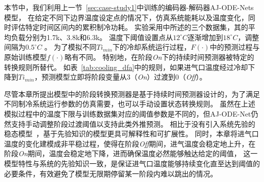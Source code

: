 本节中，我们利用上一节~\ref{sec:case-study1}中训练的编码器-解码器AJ-ODE-Nets模型，
在给定不同下边界温度设定点的情况下，仿真系统能耗以及温度变化，同时评估特定时间区间内的累积制冷功耗。
实验采用中所述的三个数据集，其的平均负载分别为1.7k、3.8k和6.3k。
温度下阈值设置点从$12^{\circ}C$逐渐增加到$18^{\circ}C$，调整间隔为$0.5^{\circ}C$ 。
为了模拟不同$Ti_{min}$下的冷却系统运行过程，$F(\cdot)$中的预测过程与原始训练模型$f(\cdot)$略有不同。
特别地，在阶段\textit{On}下的持续时间预测器被特定的转换规则所替代。
如表~\ref{tab:cooling_dfa}中的规则，如果进气口温度经过冷却下降到$Ti_{min}$，预测模型立即将阶段变量从3（\textit{On}）过渡到0（\textit{Off}）。

    尽管本章所提出模型中的阶段转换预测器是基于持续时间预测器设计的，为了满足不同制冷系统运行参数的仿真需要，也可以手动设置状态转换规则。
    虽然在上述模拟过程中的温度下限与训练数据集对应的阈值参数是不同的，但AJ-ODE-Net仍然支持手动调整阶段过渡阈值以支持此类外推预测。
    相比于没有引入系统先验的稳态模型~\cite{Yilmaz2007}，基于先验知识的模型更具可解释性和可扩展性。
    同时，本章将进气口温度的变化建模成非平稳过程，使得在阶段\textit{Off}期间，进气温度会稳定地上升，在阶段\textit{On}期间，温度会稳定地下降，进而确保温度必然能够触达给定的阈值，
    这一模型特性与系统的先验知识一致，是保证进气口温度能够持续变化直至达到阈值的必要条件，有效避免了模型无限期停留某一阶段内难以跳出的情况。

